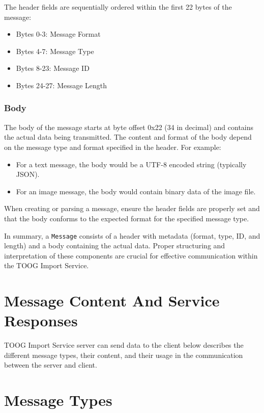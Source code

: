 \documentclass{memoir}
\begin{document}
	The header fields are sequentially ordered within the first 22 bytes of the message:
	\begin{itemize}
		\item Bytes 0-3: Message Format
		\item Bytes 4-7: Message Type
		\item Bytes 8-23: Message ID
		\item Bytes 24-27: Message Length
	\end{itemize}
	
	\subsubsection{Body}
	The body of the message starts at byte offset 0x22 (34 in decimal) and contains the actual data being transmitted. The content and format of the body depend on the message type and format specified in the header. For example:
	\begin{itemize}
		\item For a text message, the body would be a UTF-8 encoded string (typically JSON).
		\item For an image message, the body would contain binary data of the image file.
	\end{itemize}
	
	When creating or parsing a message, ensure the header fields are properly set and that the body conforms to the expected format for the specified message type.
	
	In summary, a \texttt{Message} consists of a header with metadata (format, type, ID, and length) and a body containing the actual data. Proper structuring and interpretation of these components are crucial for effective communication within the TOOG Import Service.
	
	
	\section{Message Content And Service Responses}
	TOOG Import Service server can send data to the client below describes the different message types, their content, and their usage in the communication between the server and client.
	
	\section{Message Types}
	
\end{document}
